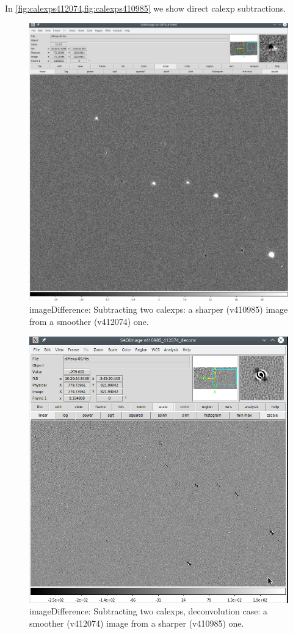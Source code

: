\documentclass{article}
\begin{document}
%
In \cref{fig:calexps412074,fig:calexps410985} we show direct calexp subtractions.
\begin{figure}
  \includegraphics[width=\textwidth]{Scr_412074_410985_calexps.png}
  \caption{\label{fig:calexps412074}imageDifference: Subtracting two
    calexps: a sharper (v410985) image from a smoother (v412074) one.}
\end{figure}
%
\begin{figure}
  \includegraphics[width=\textwidth]{Scr_v410985_412074_deconv_calexps.png}
  \caption{\label{fig:calexps410985}imageDifference: Subtracting two calexps,
    deconvolution case: a smoother (v412074) image from a sharper
    (v410985) one.}
\end{figure}
% 
\end{document}
